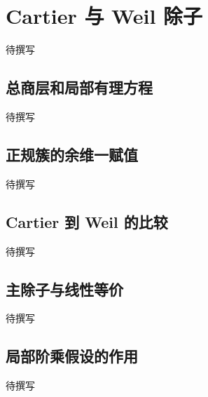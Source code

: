 
% 
% 

\section{Cartier 与 Weil 除子}
\label{g5:sec:1701}

待撰写

\subsection{总商层和局部有理方程}
\label{g5:subsec:1701:01}
待撰写

\subsection{正规簇的余维一赋值}
\label{g5:subsec:1701:02}
待撰写

\subsection{Cartier 到 Weil 的比较}
\label{g5:subsec:1701:03}
待撰写

\subsection{主除子与线性等价}
\label{g5:subsec:1701:04}
待撰写

\subsection{局部阶乘假设的作用}
\label{g5:subsec:1701:05}
待撰写
